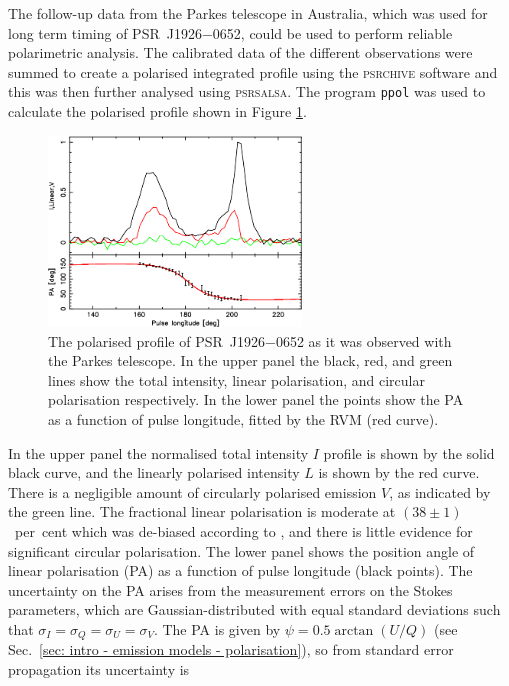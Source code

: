The follow-up data from the Parkes telescope in Australia, which was used for long term timing of PSR~J1926$-$0652, could be used to perform reliable polarimetric analysis. The calibrated data of the different observations were summed to create a polarised integrated profile using the \textsc{psrchive} software \citep{HSMx2004} and this was then further analysed using \textsc{psrsalsa}. The program \texttt{ppol} was used to calculate the polarised profile shown in Figure \ref{fig: J1926 - parkes profile}.
\begin{figure}
    \begin{center}
        \includegraphics[width=0.6\textwidth]{Figures/J1926/parkes_profile}
        \caption[Polarised profile of PSR~J1926$-$0652 observed with Parkes]{The polarised profile of PSR~J1926$-$0652 as it was observed with the Parkes telescope. In the upper panel the black, red, and green lines show the total intensity, linear polarisation, and circular polarisation respectively. In the lower panel the points show the PA as a function of pulse longitude, fitted by the RVM (red curve).}
        \label{fig: J1926 - parkes profile}
    \end{center}
\end{figure}
In the upper panel the normalised total intensity $I$ profile is shown by the solid black curve, and the linearly polarised intensity $L$ is shown by the red curve. There is a negligible amount of circularly polarised emission $V$, as indicated by the green line. The fractional linear polarisation is moderate at $(38\pm1)$~per~cent which was de-biased according to \citet{WKxx1974}, and there is little evidence for significant circular polarisation. The lower panel shows the position angle of linear polarisation (PA) as a function of pulse longitude (black points). The uncertainty on the PA arises from the measurement errors on the Stokes parameters, which are Gaussian-distributed with equal standard deviations such that $\sigma_I = \sigma_Q = \sigma_U = \sigma_V$. The PA is given by $\psi = 0.5\arctan(U/Q)$ (see Sec.~\ref{sec: intro - emission models - polarisation}), so from standard error propagation its uncertainty is
